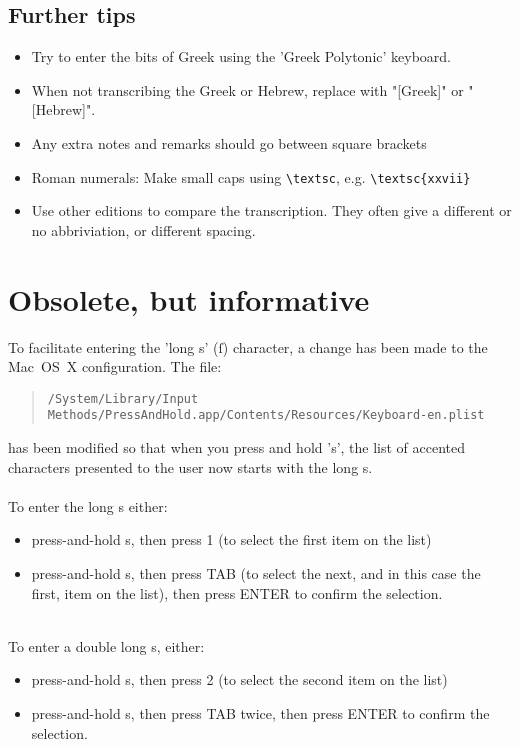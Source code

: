 \documentclass{report}
\begin{document}
\subsection{Further tips}
\begin{itemize}
\item Try to enter the bits of Greek using the 'Greek Polytonic' keyboard.
\item When not transcribing the Greek or Hebrew, replace with "[Greek]" or "[Hebrew]".
\item Any extra notes and remarks should go between square brackets
\item Roman numerals: Make small caps using \verb+\textsc+,
 e.g. \verb+\textsc{xxvii}+
\item Use other editions to compare the transcription. They often give a different or no abbriviation, or different spacing.
\end{itemize}

\section{Obsolete, but informative}
To facilitate entering the 'long s' (ſ) character, a change has been made to the Mac~OS~X configuration. The file:
\begin{quote}
\texttt{/System/Library/Input Methods/PressAndHold.app/Contents/Resources/Keyboard-en.plist}
\end{quote}
has been modified so that when you press and hold 's', the list of accented characters presented to the user now starts with the long s.
\\
\\
To enter the long s either:
\begin{itemize}
\item press-and-hold s, then press 1 (to select the first item on the list)
\item press-and-hold s, then press TAB (to select the next, and in this case the first, item on the list), then press ENTER to confirm the selection.
\end{itemize}
~
\\
To enter a double long s, either:
\begin{itemize}
\item press-and-hold s, then press 2 (to select the second item on the list)
\item press-and-hold s, then press TAB twice, then press ENTER to confirm the selection.
\end{itemize}
\end{document}
